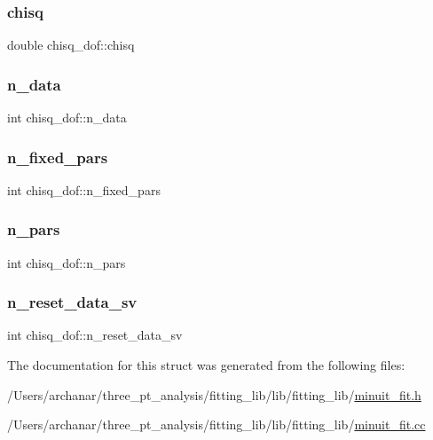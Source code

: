 \subsubsection{\texorpdfstring{chisq}{chisq}}
{\footnotesize\ttfamily double chisq\+\_\+dof\+::chisq}

\mbox{\label{structchisq__dof_ac7a1d6147b36daa15cc95be7cab6952b}} 
\subsubsection{\texorpdfstring{n\_data}{n\_data}}
{\footnotesize\ttfamily int chisq\+\_\+dof\+::n\+\_\+data}

\mbox{\label{structchisq__dof_ad0508e05295ca3c8ae6a5ab9df486fdd}} 
\subsubsection{\texorpdfstring{n\_fixed\_pars}{n\_fixed\_pars}}
{\footnotesize\ttfamily int chisq\+\_\+dof\+::n\+\_\+fixed\+\_\+pars}

\mbox{\label{structchisq__dof_a8cff2bd785177dd41a3eb0faa1a7fbc6}} 
\subsubsection{\texorpdfstring{n\_pars}{n\_pars}}
{\footnotesize\ttfamily int chisq\+\_\+dof\+::n\+\_\+pars}

\mbox{\label{structchisq__dof_ae0fec0a9a6d574999d341c26c730ab26}} 
\subsubsection{\texorpdfstring{n\_reset\_data\_sv}{n\_reset\_data\_sv}}
{\footnotesize\ttfamily int chisq\+\_\+dof\+::n\+\_\+reset\+\_\+data\+\_\+sv}



The documentation for this struct was generated from the following files\+:\begin{DoxyCompactItemize}
\item 
/\+Users/archanar/three\+\_\+pt\+\_\+analysis/fitting\+\_\+lib/lib/fitting\+\_\+lib/\mbox{\hyperlink{lib_2fitting__lib_2minuit__fit_8h}{minuit\+\_\+fit.\+h}}\item 
/\+Users/archanar/three\+\_\+pt\+\_\+analysis/fitting\+\_\+lib/lib/fitting\+\_\+lib/\mbox{\hyperlink{minuit__fit_8cc}{minuit\+\_\+fit.\+cc}}\end{DoxyCompactItemize}
